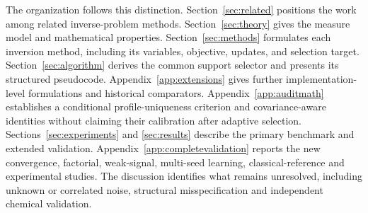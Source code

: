 The organization follows this distinction. Section~\ref{sec:related} positions the work among related inverse-problem methods. Section~\ref{sec:theory} gives the measure model and mathematical properties. Section~\ref{sec:methods} formulates each inversion method, including its variables, objective, updates, and selection target. Section~\ref{sec:algorithm} derives the common support selector and presents its structured pseudocode. Appendix~\ref{app:extensions} gives further implementation-level formulations and historical comparators. Appendix~\ref{app:auditmath} establishes a conditional profile-uniqueness criterion and covariance-aware identities without claiming their calibration after adaptive selection. Sections~\ref{sec:experiments} and \ref{sec:results} describe the primary benchmark and extended validation. Appendix~\ref{app:completevalidation} reports the new convergence, factorial, weak-signal, multi-seed learning, classical-reference and experimental studies. The discussion identifies what remains unresolved, including unknown or correlated noise, structural misspecification and independent chemical validation.
